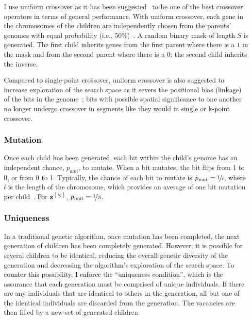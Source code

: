 \documentclass[12pt,dvipsnames]{report}
\begin{document}
I use uniform crossover as it has been suggested~\cite{Picek:2011:ECO:2184629.2184665} to be one of the best crossover operators in terms of general performance.  With uniform crossover, each gene in the chromosomes of the children are independently chosen from the parents' genomes with equal probability (i.e., 50\%)~\cite{Syswerda:1989:UCG:645512.657265}.  A random binary mask of length $S$ is generated.  The first child inherits genes from the first parent where there is a $1$ in the mask and from the second parent where there is a $0$; the second child inherits the inverse.

Compared to single-point crossover, uniform crossover is also suggested to increase exploration of the search space as it severs the positional bias (linkage) of the bits in the genome~\cite{782011}; bits with possible spatial significance to one another no longer undergo crossover in segments like they would in single or k-point crossover.

\subsubsection{Mutation}

Once each child has been generated, each bit within the child's genome has an independent chance, $p_{\text{mut}}$, to mutate.  When a bit mutates, the bit flips from 1 to 0, or from 0 to 1.  Typically, the chance of each bit to mutate is $p_{\text{mut}} = \nicefrac{1}{l}$, where $l$ is the length of the chromosome, which provides an average of one bit mutation per child~\cite{GREENWELL19951,Deb2011}.  For $\textbf{z}^{\left\{ ig \right\}}$, $p_{\text{mut}} = \nicefrac{1}{S}$.

\subsubsection{Uniqueness}

In a traditional genetic algorithm, once mutation has been completed, the next generation of children has been completely generated.  However, it is possible for several children to be identical, reducing the overall genetic diversity of the generation and decreasing the algorithm's exploration of the search space.  To counter this possibility, I enforce the ``uniqueness condition'', which is the assurance that each generation must be comprised of unique individuals.  If there are any individuals that are identical to others in the generation, all but one of the identical individuals are discarded from the generation.  The vacancies are then filled by a new set of generated children
\end{document}
